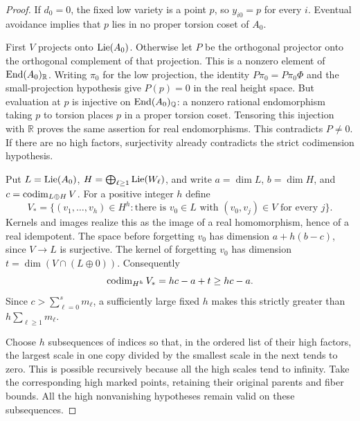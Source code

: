 \begin{proof}
If $d_0=0$, the fixed low variety is a point $p$, so
$y_{i0}=p$ for every $i$.  Eventual avoidance implies that $p$
lies in no proper torsion coset of $A_0$.

First $V$ projects onto $\operatorname{Lie}(A_0)$.  Otherwise let $P$ be the
orthogonal projector onto the orthogonal complement of that
projection.  This is a nonzero element of $\operatorname{End}(A_0)_{\mathbb R}$.
Writing $\pi_0$ for the low projection, the identity
$P\pi_0=P\pi_0\Phi$ and the small-projection hypothesis give
$P(p)=0$ in the real height space.  But evaluation at $p$ is
injective on $\operatorname{End}(A_0)_{\mathbb Q}$: a nonzero rational
endomorphism taking $p$ to torsion places $p$ in a proper torsion
coset.  Tensoring this injection with $\mathbb R$ proves the
same assertion for real endomorphisms.  This contradicts $P\ne0$.
If there are no high factors, surjectivity already contradicts
the strict codimension hypothesis.

Put $L=\operatorname{Lie}(A_0)$, $H=\bigoplus_{\ell\geq1}\operatorname{Lie}(W_\ell)$,
and write $a=\dim L$, $b=\dim H$, and
$c=\operatorname{codim}_{L\oplus H}V$.  For a positive integer $h$ define
\[
 V_* = \{(v_1,\ldots,v_h)\in H^h:
          \text{there is }v_0\in L\text{ with }(v_0,v_j)\in V
          \text{ for every }j\}.
\]
Kernels and images realize this as the image of a real
homomorphism, hence of a real idempotent.  The space before
forgetting $v_0$ has dimension $a+h(b-c)$, since $V\to L$ is
surjective.  The kernel of forgetting $v_0$ has dimension
$t=\dim(V\cap(L\oplus0))$.  Consequently
\[
 \operatorname{codim}_{H^h}V_* = hc-a+t\geq hc-a.
\]
Since $c>\sum_{\ell=0}^s m_\ell$, a sufficiently large fixed
$h$ makes this strictly greater than
$h\sum_{\ell\geq1}m_\ell$.

Choose $h$ subsequences of indices so that, in the ordered list
of their high factors, the largest scale in one copy divided by
the smallest scale in the next tends to zero.  This is possible
recursively because all the high scales tend to infinity.  Take
the corresponding high marked points, retaining their original
parents and fiber bounds.  All the high nonvanishing hypotheses
remain valid on these subsequences.


\end{proof}
